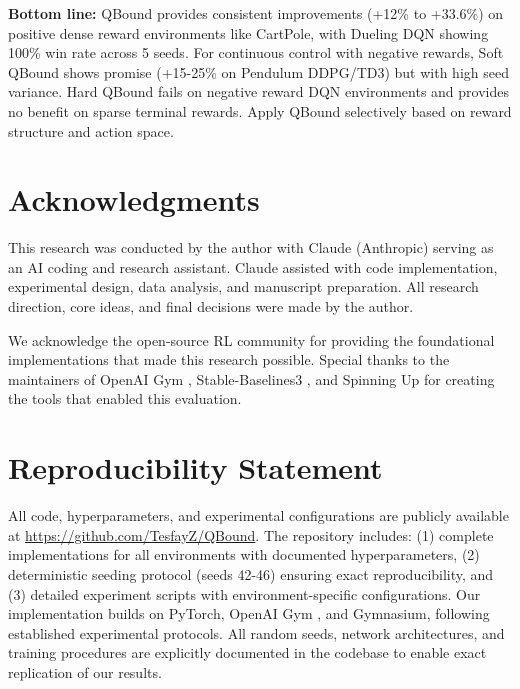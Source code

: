 \documentclass[11pt]{article}
\theoremstyle{definition}
\theoremstyle{remark}
\begin{document}
\textbf{Bottom line:} QBound provides consistent improvements (+12\% to +33.6\%) on positive dense reward environments like CartPole, with Dueling DQN showing 100\% win rate across 5 seeds. For continuous control with negative rewards, Soft QBound shows promise (+15-25\% on Pendulum DDPG/TD3) but with high seed variance. Hard QBound fails on negative reward DQN environments and provides no benefit on sparse terminal rewards. Apply QBound selectively based on reward structure and action space.

\section*{Acknowledgments}

This research was conducted by the author with Claude (Anthropic) serving as an AI coding and research assistant. Claude assisted with code implementation, experimental design, data analysis, and manuscript preparation. All research direction, core ideas, and final decisions were made by the author.

We acknowledge the open-source RL community for providing the foundational implementations that made this research possible. Special thanks to the maintainers of OpenAI Gym \citep{brockman2016openai}, Stable-Baselines3 \citep{raffin2021stable}, and Spinning Up \citep{SpinningUp2018} for creating the tools that enabled this evaluation.

\section*{Reproducibility Statement}

All code, hyperparameters, and experimental configurations are publicly available at \url{https://github.com/TesfayZ/QBound}. The repository includes: (1) complete implementations for all environments with documented hyperparameters, (2) deterministic seeding protocol (seeds 42-46) ensuring exact reproducibility, and (3) detailed experiment scripts with environment-specific configurations. Our implementation builds on PyTorch, OpenAI Gym \citep{brockman2016openai}, and Gymnasium, following established experimental protocols. All random seeds, network architectures, and training procedures are explicitly documented in the codebase to enable exact replication of our results.



\end{document}
